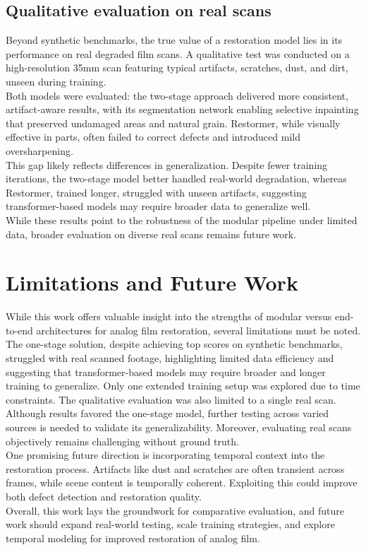 \documentclass[10pt,a4paper,twocolumn,twoside]{article}
\begin{document}
\subsection{Qualitative evaluation on real scans}
Beyond synthetic benchmarks, the true value of a restoration model lies in its performance on real degraded film scans. A qualitative test was conducted on a high-resolution 35mm scan featuring typical artifacts, scratches, dust, and dirt, unseen during training. \\
Both models were evaluated: the two-stage approach delivered more consistent, artifact-aware results, with its segmentation network enabling selective inpainting that preserved undamaged areas and natural grain. Restormer, while visually effective in parts, often failed to correct defects and introduced mild oversharpening. \\
This gap likely reflects differences in generalization. Despite fewer training iterations, the two-stage model better handled real-world degradation, whereas Restormer, trained longer, struggled with unseen artifacts, suggesting transformer-based models may require broader data to generalize well. \\
While these results point to the robustness of the modular pipeline under limited data, broader evaluation on diverse real scans remains future work.
\section{Limitations and Future Work}
While this work offers valuable insight into the strengths of modular versus end-to-end architectures for analog film restoration, several limitations must be noted. \\ The one-stage solution, despite achieving top scores on synthetic benchmarks, struggled with real scanned footage, highlighting limited data efficiency and suggesting that transformer-based models may require broader and longer training to generalize. Only one extended training setup was explored due to time constraints. The qualitative evaluation was also limited to a single real scan. Although results favored the one-stage model, further testing across varied sources is needed to validate its generalizability. Moreover, evaluating real scans objectively remains challenging without ground truth. \\ One promising future direction is incorporating temporal context into the restoration process. Artifacts like dust and scratches are often transient across frames, while scene content is temporally coherent. Exploiting this could improve both defect detection and restoration quality.\\ Overall, this work lays the groundwork for comparative evaluation, and future work should expand real-world testing, scale training strategies, and explore temporal modeling for improved restoration of analog film.
\end{document}
